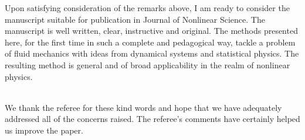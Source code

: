 \documentclass[11pt]{article}
\newcommand{\comment}[1]{{\color{blue} #1}}
\begin{document}
\noindent
\comment{
Upon satisfying consideration of the remarks above, I am ready to consider the manuscript suitable for publication in Journal of Nonlinear Science. The manuscript is well written, clear, instructive and original. The methods presented here, for the first time in such a complete and pedagogical way, tackle a problem of fluid mechanics with ideas from dynamical systems and statistical physics. The resulting method is general and of broad applicability in the realm of nonlinear physics.
}

\noindent
\\We thank the referee for these kind words and hope that we have adequately addressed all of the concerns raised. The referee's comments have certainly helped us improve the paper.
\end{document}
